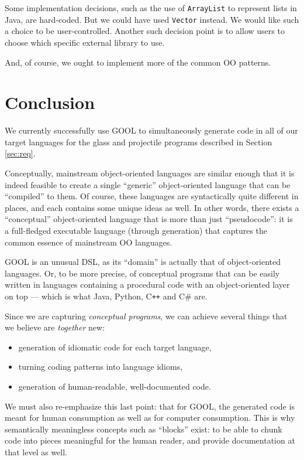 \documentclass[sigplan,review,prologue,dvipsnames]{acmart}
\newcommand{\Csharp}{C\#}
\newcommand{\Cplusplus}{C\texttt{++}}
\begin{document}
Some implementation decisions, such as the use of \verb|ArrayList| to represent
lists in Java, are hard-coded. But we could have used \verb|Vector| instead.
We would like such a choice to be user-controlled. Another such decision
point is to allow users to choose which specific external library to use.

And, of course, we ought to implement more of the common OO patterns.

\section{Conclusion} \label{sec:conclusions}

We currently successfully use GOOL to simultaneously generate code in all of 
our target languages for the glass and projectile programs described in Section 
\ref{sec:req}. 

Conceptually, mainstream object-oriented languages are similar enough that it
is indeed feasible to create a single ``generic'' object-oriented language that
can be ``compiled'' to them.  Of course, these languages are syntactically
quite different in places, and each contains some unique ideas as well.
In other words, there exists a ``conceptual'' object-oriented language that
is more than just ``pseudocode'': it is a full-fledged executable language
(through generation) that captures the common essence of mainstream OO
languages.

GOOL is an unusual DSL, as its ``domain'' is actually that of object-oriented
languages. Or, to be more precise, of conceptual programs that can be
easily written in languages containing a procedural code with an
object-oriented layer on top --- which is what Java, Python, \Cplusplus{} and
\Csharp{} are.

Since we are capturing \emph{conceptual programs}, we can achieve
several things that we believe are \emph{together} new:
\begin{itemize}
\item generation of idiomatic code for each target language,
\item turning coding patterns into language idioms,
\item generation of human-readable, well-documented code.
\end{itemize}

We must also re-emphasize this last point: that for GOOL, the generated code
is meant for human consumption as well as for computer consumption. This is
why semantically meaningless concepts such as ``blocks'' exist: to be able
to chunk code into pieces meaningful for the human reader, and provide
documentation at that level as well.
\end{document}
